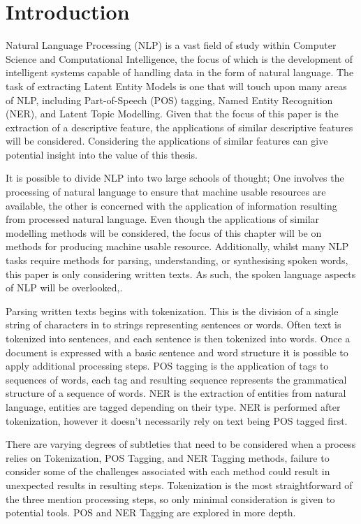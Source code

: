 \documentclass[10pt]{report}
\begin{document}
\section{Introduction}
Natural Language Processing (NLP) is a vast field of study within Computer Science and Computational Intelligence, the focus of which is the development of intelligent systems capable of handling data in the form of natural language. The task of extracting Latent Entity Models is one that will touch upon many areas of NLP, including Part-of-Speech (POS) tagging, Named Entity Recognition (NER), and Latent Topic Modelling. Given that the focus of this paper is the extraction of a descriptive feature, the applications of similar descriptive features will be considered. Considering the applications of similar features can give potential insight into the value of this thesis.

It is possible to divide NLP into two large schools of thought; One involves the processing of natural language to ensure that machine usable resources are available, the other is concerned with the application of information resulting from processed natural language. Even though the applications of similar modelling methods will be considered, the focus of this chapter will be on methods for producing machine usable resource. Additionally, whilst many NLP tasks require methods for parsing, understanding, or synthesising spoken words, this paper is only considering written texts. As such, the spoken language aspects of NLP will be overlooked,.

Parsing written texts begins with tokenization. This is the division of a single string of characters in to strings representing sentences or words. Often text is tokenized into sentences, and each sentence is then tokenized into words. Once a document is expressed with a basic sentence and word structure it is possible to apply additional processing steps. POS tagging is the application of tags to sequences of words, each tag and resulting sequence represents the grammatical structure of a sequence of words. NER is the extraction of entities from natural language, entities are tagged depending on their type. NER is performed after tokenization, however it doesn’t necessarily rely on text being POS tagged first.

There are varying degrees of subtleties that need to be considered when a process relies on Tokenization, POS Tagging, and NER Tagging methods, failure to consider some of the challenges associated with each method could result in unexpected results in resulting steps. Tokenization is the most straightforward of the three mention processing steps, so only minimal consideration is given to potential tools. POS and NER Tagging are explored in more depth.
\end{document}
